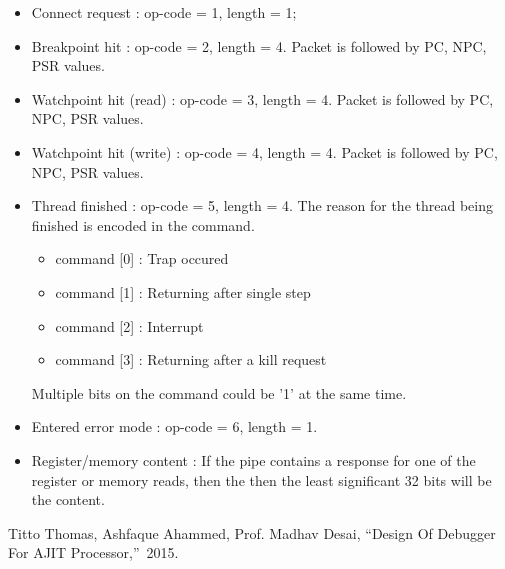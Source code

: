 \documentclass[a4paper, 11pt]{article}
\begin{document}
\begin{itemize}
		\item Connect request : op-code = 1, length = 1;
		\item Breakpoint hit : op-code = 2, length = 4. Packet is followed by PC, NPC, PSR values.
		\item Watchpoint hit (read) : op-code = 3, length = 4. Packet is followed by PC, NPC, PSR values.
		\item Watchpoint hit (write) : op-code = 4, length = 4. Packet is followed by PC, NPC, PSR values.
		
		\item Thread finished : op-code = 5, length = 4. The reason for the thread being finished is encoded in the command.
		\begin{itemize}
				\item command [0] : Trap occured
				\item command [1] : Returning after single step
				\item command [2] : Interrupt
				\item command [3] : Returning after a kill request
		\end{itemize}
		Multiple bits on the command could be '1' at the same time.
		
		\item Entered error mode : op-code = 6, length = 1.
		
		\item Register/memory content : If the pipe contains a response for one of the register or memory reads, then the then the least significant 32 bits will be the content.
\end{itemize}

\newpage

\begin{thebibliography}{main}
	
	 Titto Thomas, Ashfaque Ahammed, Prof. Madhav Desai, \textquotedblleft Design Of Debugger For AJIT Processor,\textquotedblright\, 2015.
	
\end{thebibliography}
\end{document}
